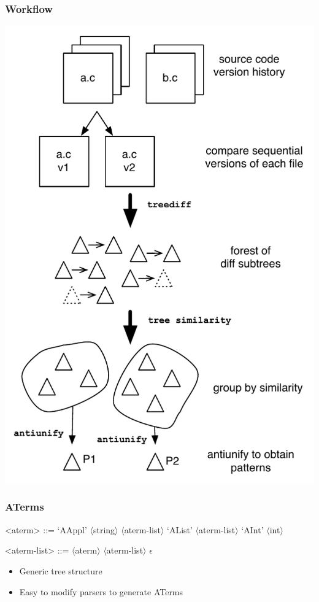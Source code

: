 \documentclass[ignorenonframetext,]{beamer}
\begin{document}
\begin{frame}\frametitle{Workflow}

\begin{center}

  \includegraphics[height=0.8\textheight]{figures/workflow.pdf}

\end{center}

\end{frame}

\begin{frame}\frametitle{ATerms}

\setlength{\grammarindent}{8em}

\begin{grammar}
<aterm> ::= `AAppl' $\langle$string$\rangle$ $\langle$aterm-list$\rangle$
\alt `AList' $\langle$aterm-list$\rangle$
\alt `AInt' $\langle$int$\rangle$

<aterm-list> ::= $\langle$aterm$\rangle$ $\langle$aterm-list$\rangle$
\alt $\epsilon$
\end{grammar}

\begin{itemize}
\item
  Generic tree structure
\item
  Easy to modify parsers to generate ATerms
\end{itemize}

\end{frame}
\end{document}
